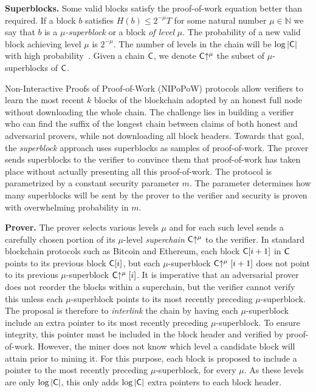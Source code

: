 \noindent
\textbf{Superblocks.}
Some valid blocks satisfy the proof-of-work equation better than required. If
a block $b$ satisfies $H(b) \leq 2^{-\mu} T$ for some natural number
$\mu \in \mathbb{N}$ we say that $b$ is a \emph{$\mu$-superblock} or a block
\emph{of level} $\mu$. The probability of a new valid block achieving level
$\mu$ is $2^{-\mu}$. The number of levels in the chain will be $\log|\mathsf{C}|$
with high probability~\cite{popow}. Given a chain $\mathsf{C}$, we denote
$\mathsf{C}\negthickspace\uparrow^\mu$ the subset of $\mu$-superblocks of $\mathsf{C}$.

Non-Interactive Proofs of Proof-of-Work (NIPoPoW) protocols allow verifiers to
learn the most recent $k$ blocks of the blockchain adopted by an honest full
node without downloading the whole chain. The challenge lies in building a
verifier who can find the suffix of the longest chain between claims of both
honest and adversarial provers, while not downloading all block headers. Towards
that goal, the \emph{superblock} approach uses superblocks as samples of
proof-of-work. The prover sends superblocks to the verifier to convince them
that proof-of-work has taken place without actually presenting all this
proof-of-work. The protocol is parametrized by a constant security parameter
$m$. The parameter determines how many superblocks will be sent by the prover to
the verifier and security is proven with overwhelming probability in $m$.

\noindent \textbf{Prover.} The prover selects various levels $\mu$ and for each
such level sends a carefully chosen portion of its $\mu$-level
\emph{superchain} $\mathsf{C}\negthickspace\uparrow^\mu$ to the verifier. In standard blockchain
protocols such as Bitcoin and Ethereum, each block $\mathsf{C}[i + 1]$ in $\mathsf{C}$
points to its previous block $\mathsf{C}[i]$, but each $\mu$-superblock
$\mathsf{C}\negthickspace\uparrow^\mu[i + 1]$ does not point to its previous $\mu$-superblock
$\mathsf{C}\negthickspace\uparrow^\mu[i]$. It is imperative that an adversarial prover does not
reorder the blocks within a superchain, but the verifier cannot verify this
unless each $\mu$-superblock points to its most recently preceding
$\mu$-superblock. The proposal is therefore to \emph{interlink} the chain by
having each $\mu$-superblock include an extra pointer to its most recently
preceding $\mu$-superblock. To ensure integrity, this pointer must be included
in the block header and verified by proof-of-work. However, the miner does not
know which level a candidate block will attain prior to mining it. For this
purpose, each block is proposed to include a pointer to the most recently
preceding $\mu$-superblock, for every $\mu$.
As these levels are only $\log|\mathsf{C}|$, this only adds $\log|\mathsf{C}|$ extra
pointers to each block header.


